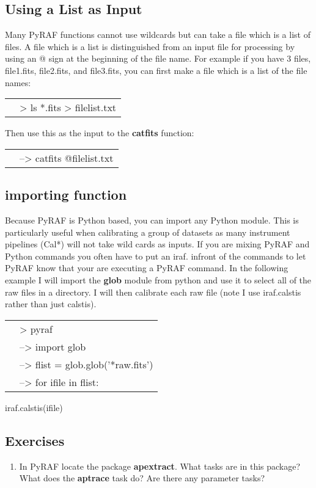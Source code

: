 \subsection{Using a List as Input}
Many PyRAF functions cannot use wildcards but can take a file which is a list of files. A file which is a list is distinguished from an input file for processing by using an @ sign at the beginning of the file name. For example if you have 3 files, file1.fits, file2.fits, and file3.fits, you can first make a file which is a list of the file names:

\begin{minipage}{4in}
\setlength{\oddsidemargin}{0.25 in}
\setlength{\evensidemargin}{0.25 in}
\begin{tabular}{ll}
& {\color{RoyalBlue}> ls *.fits > filelist.txt } \\
\end{tabular}


Then use this as the input to the {\bf catfits} function: \\
\begin{tabular}{ll}
& {\color{RoyalBlue}--> catfits @filelist.txt } \\
\end{tabular}
\end{minipage}


\subsection{importing function}
Because PyRAF is Python based, you can import any Python module. This is particularly useful when calibrating a group of datasets as many instrument pipelines (Cal*) will not take wild cards as inputs.  If you are mixing PyRAF and Python commands you often have to put an iraf. infront of the commands to let PyRAF know that your are executing a PyRAF command. In the following example I will import the {\bf glob} module from python and use it to select all of the raw files in a directory. I will then calibrate each raw file (note I use iraf.calstis rather than just calstis).

\begin{minipage}{4in}
\setlength{\oddsidemargin}{0.25 in}
\setlength{\evensidemargin}{0.25 in}
\begin{tabular}{ll}
& {\color{RoyalBlue}> pyraf}\\
& {\color{RoyalBlue}--> import glob}\\
& {\color{RoyalBlue}--> flist = glob.glob('*raw.fits')}\\
& {\color{RoyalBlue}--> for ifile in flist:}\\
\end{tabular}
\setlength{\parindent}{0.5 in}

{\color{RoyalBlue}iraf.calstis(ifile)}\\
\end{minipage}

\subsection{Exercises}
\begin{enumerate}
\item In PyRAF locate the package {\bf apextract}. What tasks are in this package? What does the {\bf aptrace} task do? Are there any parameter tasks?
\end{enumerate}

